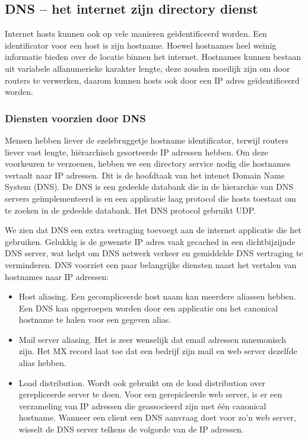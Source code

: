 \subsection{DNS – het internet zijn directory dienst}

Internet hosts kunnen ook op vele manieren geïdentificeerd worden. Een identificator voor een host is zijn hostname. Hoewel hostnames heel weinig informatie bieden over de locatie binnen het internet. Hostnames kunnen bestaan uit variabele alfanumerieke karakter lengte, deze zouden moeilijk zijn om door routers te verwerken, daarom kunnen hosts ook door een IP adres geïdentificeerd worden.

\subsubsection{Diensten voorzien door DNS}

Mensen hebben liever de ezelsbruggetje hostname identificator, terwijl routers liever vast lengte, hiërarchisch gesorteerde IP adressen hebben. Om deze voorkeuren te verzoenen, hebben we een directory service nodig die hostnames vertaalt naar IP adressen. Dit is de hoofdtaak van het intenet Domain Name System (DNS). De DNS is een gedeelde databank die in de hierarchie van DNS servers geïmplementeerd is en een applicatie laag protocol die hosts toestaat om te zoeken in de gedeelde databank. Het DNS protocol gebruikt UDP.

We zien dat DNS een extra vertraging toevoegt aan de internet applicatie die het gebruiken. Gelukkig is de gewenste IP adres vaak gecached in een dichtbijzijnde DNS server, wat helpt om DNS netwerk verkeer en gemiddelde DNS vertraging te verminderen. DNS voorziet een paar belangrijke diensten naast het vertalen van hostnames naar IP adressen:

\begin{itemize}
  \item Host aliasing. Een gecompliceerde host naam kan meerdere aliassen hebben. Een DNS kan opgeroepen worden door een applicatie om het canonical hostname te halen voor een gegeven alias.
\item Mail server aliasing. Het is zeer wenselijk dat email adressen mnemonisch zijn. Het MX record laat toe dat een bedrijf zijn mail en web server dezelfde alias hebben.
\item Load distribution. Wordt ook gebruikt om de load distribution over gerepliceerde server te doen. Voor een gerepicleerde web server, is er een verzameling van IP adressen die geassocieerd zijn met één canonical hostname. Wanneer een client een DNS aanvraag doet voor zo’n web server, wisselt de DNS server telkens de volgorde van de IP adressen.
\end{itemize}

